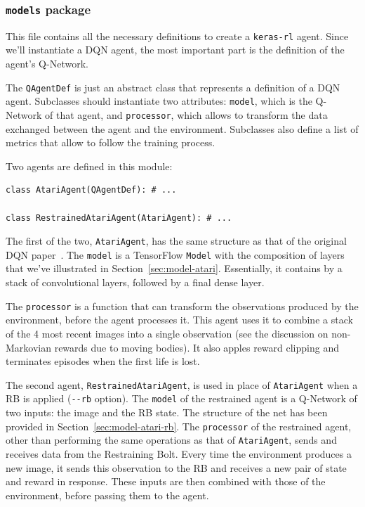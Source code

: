\subsubsection*{\texttt{models} package}

This file contains all the necessary definitions to create a \texttt{keras-rl}
agent. Since we'll instantiate a DQN agent, the most important part is
the definition of the agent's Q-Network.

The \texttt{QAgentDef} is just an abstract class that represents a definition
of a DQN agent. Subclasses should instantiate two attributes:
\texttt{model}, which is the Q-Network of that agent, and \texttt{processor},
which allows to transform the data exchanged between the agent and the
environment.  Subclasses also define a list of metrics that allow to follow
the training process. 

Two agents are defined in this module:
\begin{verbatim}
class AtariAgent(QAgentDef): # ...

class RestrainedAtariAgent(AtariAgent): # ...
\end{verbatim}

The first of the two, \texttt{AtariAgent}, has the same structure as that of
the original DQN paper~\cite{bib:atari-deeprl}. The \texttt{model} is a
TensorFlow \texttt{Model} with the composition of layers that we've
illustrated in Section~\ref{sec:model-atari}. Essentially, it contains by a
stack of convolutional layers, followed by a final dense layer.

The \texttt{processor} is a function that can transform the observations
produced by the environment, before the agent processes it. This agent uses it
to combine a stack of the 4 most recent images into a single observation (see
the discussion on non-Markovian rewards due to moving bodies). It also apples
reward clipping and terminates episodes when the first life is lost.

The second agent, \texttt{RestrainedAtariAgent}, is used in place of
\texttt{AtariAgent} when a RB is applied (\verb|--rb| option). The
\texttt{model} of the restrained agent is a Q-Network of two inputs: the image
and the RB state. The structure of the net has been provided in
Section~\ref{sec:model-atari-rb}. The \texttt{processor} of the restrained
agent, other than performing the same operations as that of
\texttt{AtariAgent}, sends and receives data from the Restraining Bolt. Every
time the environment produces a new image, it sends this observation to the
RB and receives a new pair of state and reward in response. These inputs are
then combined with those of the environment, before passing them to the agent.

